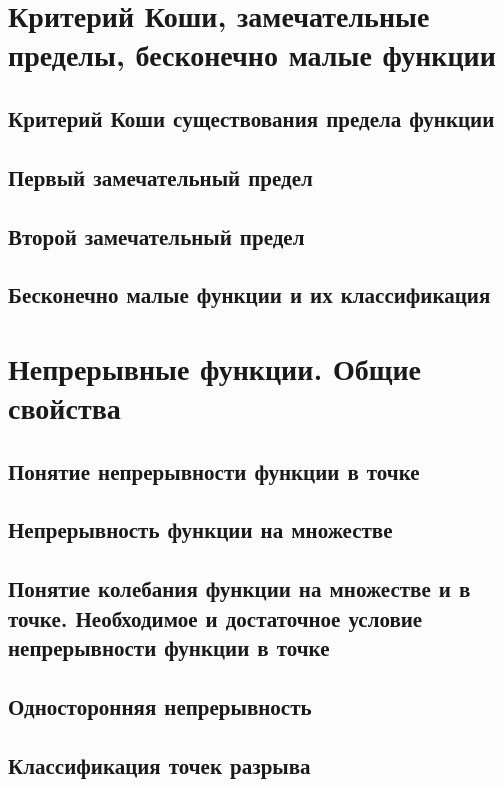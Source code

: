 \section{Критерий Коши, замечательные пределы, бесконечно малые функции}
\subsection{Критерий Коши существования предела функции}
\subsection{Первый замечательный предел}

\subsection{Второй замечательный предел}

\subsection{Бесконечно малые функции и их классификация}


\section{Непрерывные функции. Общие свойства}
\subsection{Понятие непрерывности функции в точке}

\subsection{Непрерывность функции на множестве}

\subsection{Понятие колебания функции на множестве и в точке. Необходимое и достаточное условие непрерывности функции в точке}

\subsection{Односторонняя непрерывность}

\subsection{Классификация точек разрыва}
